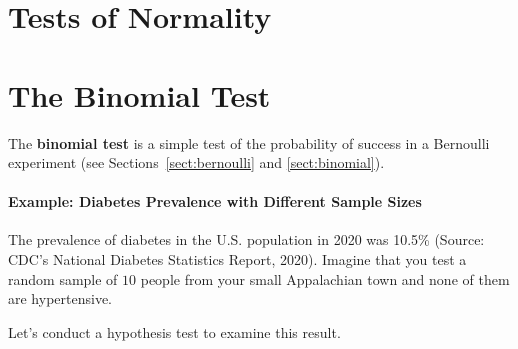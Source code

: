 

\section{Tests of Normality}


\section{The Binomial Test}

The \textbf{binomial test} is a simple test of the probability of success in a Bernoulli experiment (see Sections~\ref{sect:bernoulli} and \ref{sect:binomial}). 

\paragraph{Example: Diabetes Prevalence with Different Sample Sizes} The prevalence of diabetes in the U.S. population in 2020 was 10.5\% (Source: CDC's National Diabetes Statistics Report, 2020). Imagine that you test a random sample of $10$ people from your small Appalachian town and none of them are hypertensive.

\noindent Let's conduct a hypothesis test to examine this result.

